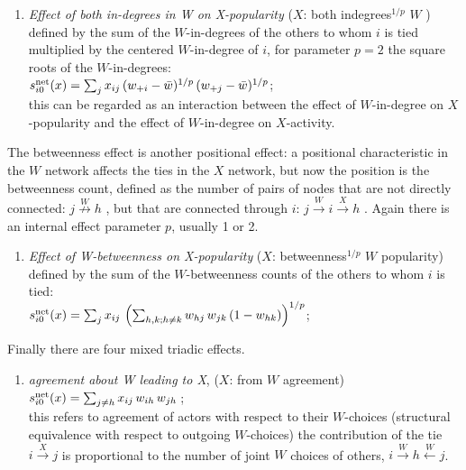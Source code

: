 \documentclass[a4paper,fleqn]{article}
\newcommand{\+}{\, + \,}
\newcommand{\vit}{\theenumi}
\newcounter{savenumi}
\begin{document}
{\begin{enumerate}
 \item {\em Effect of both in-degrees in W on X-popularity } ($X$: both indegrees$^{1/p}$ $W$ )
 defined by   the sum of  the $W$-in-degrees of the others to whom $i$ is tied
 multiplied by the centered $W$-in-degree of $i$,
 for parameter $p = 2$ the square roots of the $W$-in-degrees:\\
 $s^{\rm net}_{i\vit}(x) =  \sum_j x_{ij}\, (w_{+i} - \bar w)^{1/p} \, (w_{+j} - \bar w)^{1/p}  $;\\
 this can be regarded as an interaction between the effect of $W$-in-degree on $X$-popularity
 and the effect of $W$-in-degree on $X$-activity.
\setcounter{savenumi}{\value{enumi}}
\end{enumerate}
\smallskip
The betweenness effect is another positional effect:
a positional characteristic in the $W$ network affects the
ties in the $X$ network, but now the position is the betweenness count,
defined as the number of pairs of nodes that are not directly connected:
 $j \stackrel{W}{\nrightarrow} h$ ,
but that are connected through $i$:
 $j \stackrel{W}{\rightarrow} i  \stackrel{X}{\rightarrow} h$ .
 Again there is an internal effect parameter $p$, usually
1 or 2.
\begin{enumerate}
\setcounter{enumi}{\value{savenumi}}
 \item {\em Effect of W-betweenness on X-popularity } ($X$: betweenness$^{1/p}$ $W$ popularity)
 defined by   the sum of  the $W$-betweenness counts of the others to whom $i$ is tied:\\
 $s^{\rm net}_{i\vit}(x) =  \sum_j x_{ij}\, \left(\sum_{h,k; h \neq k}w_{hj}\,w_{jk}\,(1-w_{hk})\right)^{1/p}  $;\\
\setcounter{savenumi}{\value{enumi}}
\end{enumerate}
\smallskip
Finally there are four mixed triadic effects.
\begin{enumerate}
\setcounter{enumi}{\value{savenumi}}
\item
\begin{minipage}[t]{.7\textwidth}
 {\em agreement about W leading to X}, ($X$: from $W$ agreement)\\
 $s^{\rm net}_{i\vit}(x) = \sum_{j \neq h} x_{ij}\, w_{ih}\, w_{jh}\,$;\\
 this refers to agreement of actors with respect to their $W$-choices
 (structural equivalence with respect to outgoing $W$-choices)
 the contribution of the tie $i \stackrel{X}{\rightarrow} j$
 is proportional to
 the number of joint $W$ choices of others,
 $i \stackrel{W}{\rightarrow} h \stackrel{W}{\leftarrow} j$.

\end{minipage}
\end{enumerate}}
\end{document}
